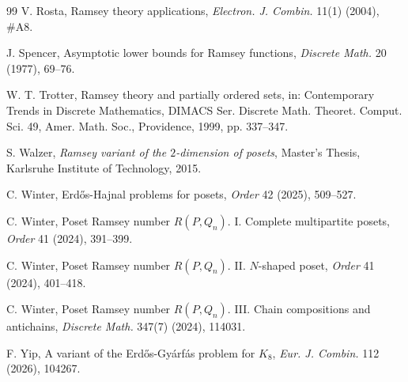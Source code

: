 \documentclass[twoside,12pt]{article}
\begin{document}
\begin{thebibliography}{99}
V. Rosta, Ramsey theory applications, \emph{Electron. J. Combin.} 11(1) (2004), \#A8.

J. Spencer, Asymptotic lower bounds for Ramsey functions, \emph{Discrete Math.} 20 (1977), 69--76.

W. T. Trotter, Ramsey theory and partially ordered sets, in: Contemporary Trends in Discrete Mathematics, DIMACS Ser. Discrete Math. Theoret. Comput. Sci. 49, Amer. Math. Soc., Providence, 1999, pp. 337--347.

S. Walzer, \emph{Ramsey variant of the $2$-dimension of posets}, Master's Thesis, Karlsruhe Institute of Technology, 2015.

C. Winter, Erdős-Hajnal problems for posets, \textit{Order} 42 (2025), 509--527.

C. Winter, Poset Ramsey number $R(P,Q_{n})$. I. Complete multipartite posets, \emph{Order} 41 (2024), 391--399.

C. Winter, Poset Ramsey number $R(P,Q_{n})$. II. $N$-shaped poset, \emph{Order} 41 (2024), 401--418.

C. Winter, Poset Ramsey number $R(P,Q_{n})$. III. Chain compositions and antichains, \emph{Discrete Math.} 347(7) (2024), 114031.

F. Yip, A variant of the Erd\H{o}s-Gy\'{a}rf\'{a}s problem for $K_8$, \emph{Eur. J. Combin.} 112 (2026), 104267.

\end{thebibliography}
\end{document}
